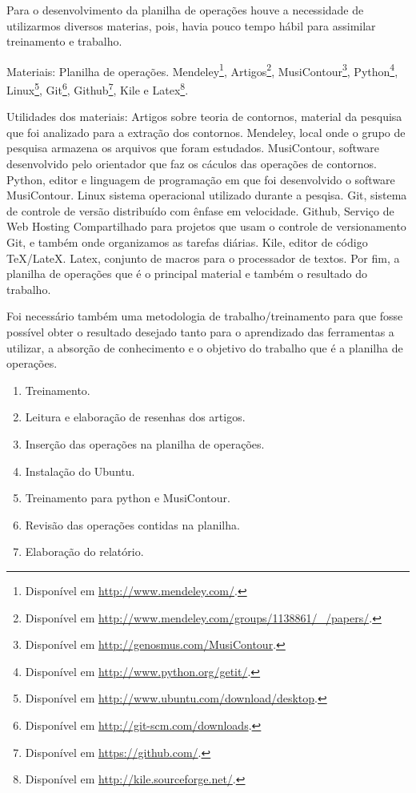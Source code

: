 \documentclass[11pt]{article}
\begin{document}
\label{sec:materiais}

Para o desenvolvimento da planilha de operações houve a necessidade de 
utilizarmos diversos materias, pois, havia pouco tempo hábil para assimilar
treinamento e trabalho.

Materiais:
Planilha de operações.
Mendeley\footnote{Disponível em
  \url{http://www.mendeley.com/}.}, Artigos\footnote{Disponível em
  \url{http://www.mendeley.com/groups/1138861/_/papers/}.},
  MusiContour\footnote{Disponível em \url{http://genosmus.com/MusiContour}.},
  Python\footnote{Disponível em  \url{http://www.python.org/getit/}.},
  Linux\footnote{Disponível em
  \url{http://www.ubuntu.com/download/desktop}.},
  Git\footnote{Disponível em
  \url{http://git-scm.com/downloads}.}, Github\footnote{Disponível em
  \url{https://github.com/}.}, Kile e Latex\footnote{Disponível em
  \url{http://kile.sourceforge.net/}.}.
  
Utilidades dos materiais: Artigos sobre teoria de contornos, material da pesquisa
que foi analizado para a extração dos contornos. Mendeley, local onde o grupo de pesquisa
armazena os arquivos que foram estudados. MusiContour, software desenvolvido pelo orientador
que faz os cáculos das operações de contornos. Python, editor e linguagem de programação em 
que foi desenvolvido o software MusiContour. Linux sistema operacional utilizado durante a pesqisa.
Git, sistema de controle de versão distribuído com ênfase em velocidade. Github, Serviço de Web 
Hosting Compartilhado para projetos que usam o controle de versionamento Git, e também onde organizamos
as tarefas diárias. Kile, editor de código TeX/LateX. Latex, conjunto de macros para o processador de 
textos. Por fim, a planilha de operações que é o principal material e também o resultado do trabalho.


Foi necessário também uma metodologia de trabalho/treinamento para que fosse possível obter
o resultado desejado tanto para o aprendizado das ferramentas a utilizar, a absorção de conhecimento
e o objetivo do trabalho que é a planilha de operações.

\begin{enumerate} 
\item Treinamento.
\item Leitura e elaboração de resenhas dos artigos.
\item Inserção das operações na planilha de operações.
\item Instalação do Ubuntu.
\item Treinamento para python e MusiContour.
\item Revisão das operações contidas na planilha.
\item Elaboração do relatório.
\end{enumerate}
\end{document}
